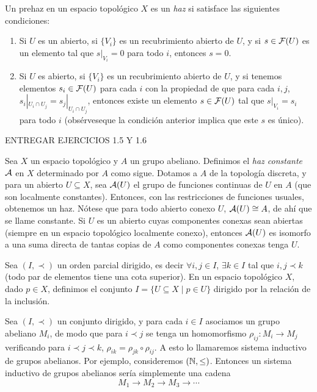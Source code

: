 \documentclass[GA.tex]{subfiles}
\begin{document}
\begin{defi}
Un prehaz en un espacio topológico $X$ es un \emph{haz} si satisface las siguientes condiciones:
\begin{enumerate}
\item Si $U$ es un abierto, si $\{V_i\}$ es un recubrimiento abierto de $U$, y si $s\in\mathcal{F}(U)$ es un elemento tal que $s|_{V_i}=0$ para todo $i$, entonces $s=0$. 
\item Si $U$ es abierto, si $\{V_i\}$ es un recubrimiento abierto de $U$, y si tenemos elementos $s_i\in\mathcal{F}(U)$ para cada $i$ con la propiedad de que para cada $i,j$, $s_i|_{U_i\cap U_j}=s_j|_{U_i\cap U_j}$, entonces existe un elemento $s\in\mathcal{F}(U)$ tal que $s|_{V_i}=s_i$ para todo $i$ (obsérveseque la condición anterior implica que este $s$ es único). 
\end{enumerate}
\end{defi}

ENTREGAR EJERCICIOS 1.5 Y 1.6


\begin{ej}
Sea $X$ un espacio topológico y $A$ un grupo abeliano. Definimos el \emph{haz constante} $\mathcal{A}$ en $X$ determinado por $A$ como sigue. Dotamos a $A$ de la topología discreta, y para un abierto $U\subseteq X$, sea $\mathcal{A}(U)$ el grupo de funciones continuas de $U$ en $A$ (que son localmente constantes). Entonces, con las restricciones de funciones usuales, obtenemos un haz. Nótese que para todo abierto conexo $U$, $\mathcal{A}(U)\cong A$, de ahí que se llame constante. Si $U$ es un abierto cuyas componentes conexas sean abiertas (siempre en un espacio topológico localmente conexo), entonces $\mathcal{A}(U)$ es isomorfo a una suma directa de tantas copias de $A$ como componentes conexas tenga $U$. 
\end{ej}

Sea $(I,\prec)$ un orden parcial dirigido, es decir $\forall i,j\in I$, $\exists k\in I$ tal que $i,j\prec k$ (todo par de elementos tiene una cota superior). En un espacio topológico $X$, dado $p\in X$, definimos el conjunto $I=\{U\subseteq X\mid p\in U\}$ dirigido por la relación de la inclusión.

Sea $(I,\prec)$ un conjunto dirigido, y para cada $i\in I$ asociamos un grupo abeliano $M_i$, de modo que para $i\prec j$ se tenga un homomorfismo $\rho_{ij}:M_i\to M_j$ verificando para $i\prec j\prec k$, $\rho_{ik}=\rho_{jk}\circ\rho_{ij}$. A esto lo llamaremos sistema inductivo de grupos abelianos. Por ejemplo, consideremos $(\mathbb{N},\leq)$. Entonces un sistema inductivo de grupos abelianos sería simplemente una cadena
\[
M_1\to M_2\to M_3\to\cdots
\]
\end{document}
